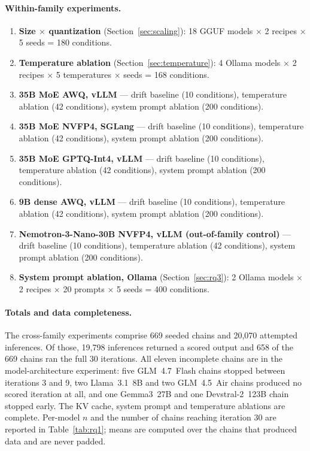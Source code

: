\documentclass[11pt]{article}
\begin{document}
\paragraph{Within-family experiments.}
\begin{enumerate}[leftmargin=*]
  \item \textbf{Size $\times$ quantization} (Section~\ref{sec:scaling}):
        18 GGUF models $\times$ 2 recipes $\times$ 5 seeds = 180 conditions.
  \item \textbf{Temperature ablation} (Section~\ref{sec:temperature}):
        4 Ollama models $\times$ 2 recipes $\times$ 5 temperatures
        $\times$ seeds = 168 conditions.
  \item \textbf{35B MoE AWQ, vLLM} --- drift baseline (10 conditions),
        temperature ablation (42 conditions), system prompt ablation
        (200 conditions).
  \item \textbf{35B MoE NVFP4, SGLang} --- drift baseline (10 conditions),
        temperature ablation (42 conditions), system prompt ablation
        (200 conditions).
  \item \textbf{35B MoE GPTQ-Int4, vLLM} --- drift baseline (10 conditions),
        temperature ablation (42 conditions), system prompt ablation
        (200 conditions).
  \item \textbf{9B dense AWQ, vLLM} --- drift baseline (10 conditions),
        temperature ablation (42 conditions), system prompt ablation
        (200 conditions).
  \item \textbf{Nemotron-3-Nano-30B NVFP4, vLLM (out-of-family control)} ---
        drift baseline (10 conditions), temperature ablation (42 conditions),
        system prompt ablation (200 conditions).
  \item \textbf{System prompt ablation, Ollama} (Section~\ref{sec:rq3}):
        2 Ollama models $\times$ 2 recipes $\times$ 20 prompts $\times$ 5 seeds
        = 400 conditions.
\end{enumerate}

\paragraph{Totals and data completeness.}
The cross-family experiments comprise 669 seeded chains and 20{,}070 attempted
inferences. Of those, 19{,}798 inferences returned a scored output and 658 of
the 669 chains ran the full 30 iterations. All eleven incomplete chains are in
the model-architecture experiment: five GLM~4.7~Flash chains stopped between
iterations 3 and 9, two Llama~3.1~8B and two GLM~4.5~Air chains produced no
scored iteration at all, and one Gemma3~27B and one Devstral-2~123B chain
stopped early. The KV cache, system prompt and temperature ablations are
complete. Per-model $n$ and the number of chains reaching iteration 30 are
reported in Table~\ref{tab:rq1}; means are computed over the chains that
produced data and are never padded.
\end{document}
